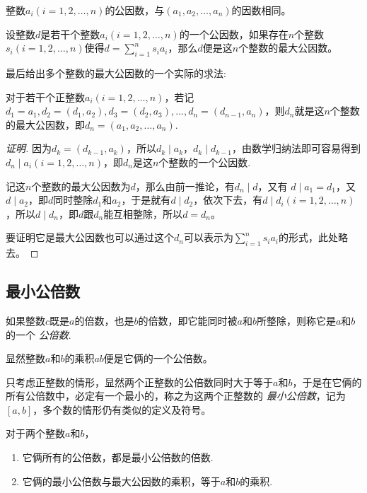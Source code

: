 \begin{inference}
  整数$a_i(i=1,2,\ldots,n)$的公因数，与$(a_1,a_2,\ldots,a_n)$的因数相同。
\end{inference}

\begin{theorem}
  设整数$d$是若干个整数$a_i(i=1,2,\ldots,n)$的一个公因数，如果存在$n$个整数$s_i(i=1,2,\ldots,n)$使得$d=\sum_{i=1}^n s_ia_i$，那么$d$便是这$n$个整数的最大公因数。
\end{theorem}

最后给出多个整数的最大公因数的一个实际的求法:
\begin{theorem}
  对于若干个正整数$a_i(i=1,2,\ldots,n)$，若记$d_1=a_1, d_2=(d_1,a_2), d_3=(d_2, a_3),\ldots,d_n=(d_{n-1},a_n)$，则$d_n$就是这$n$个整数的最大公因数，即$d_n=(a_1,a_2,\ldots,a_n)$.
\end{theorem}

\begin{proof}[证明]
  因为$d_k=(d_{k-1},a_k)$，所以$d_k \mid a_k$，$d_k \mid d_{k-1}$，由数学归纳法即可容易得到$d_n \mid a_i(i=1,2,\dots,n)$，即$d_n$是这$n$个整数的一个公因数.

  记这$n$个整数的最大公因数为$d$，那么由前一推论，有$d_n \mid d$，又有 $d \mid a_1=d_1$，又$d \mid a_2$，即$d$同时整除$d_1$和$a_2$，于是就有$d \mid d_2$，依次下去，有$d \mid d_i(i=1,2,\ldots,n)$，所以$d \mid d_n$，即$d$跟$d_n$能互相整除，所以$d=d_n$。

  要证明它是最大公因数也可以通过这个$d_n$可以表示为$\sum_{i=1}^n s_ia_i$的形式，此处略去。
\end{proof}

\subsection{最小公倍数}
\label{sec:least-common-multiple}

\begin{definition}
  如果整数$c$既是$a$的倍数，也是$b$的倍数，即它能同时被$a$和$b$所整除，则称它是$a$和$b$的一个 \emph{公倍数}.
\end{definition}
显然整数$a$和$b$的乘积$ab$便是它俩的一个公倍数。

只考虑正整数的情形，显然两个正整数的公倍数同时大于等于$a$和$b$，于是在它俩的所有公倍数中，必定有一个最小的，称之为这两个正整数的 \emph{最小公倍数}，记为$[a,b]$，多个数的情形仍有类似的定义及符号。

\begin{theorem}
  对于两个整数$a$和$b$，
  \begin{enumerate}
  \item 它俩所有的公倍数，都是最小公倍数的倍数.
  \item 它俩的最小公倍数与最大公因数的乘积，等于$a$和$b$的乘积.
  \end{enumerate}
\end{theorem}

